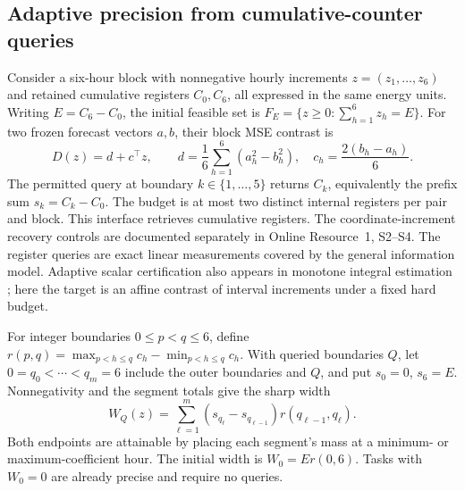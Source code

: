 \subsection{Adaptive precision from cumulative-counter queries}
\label{sec:counter-precision-method}
Consider a six-hour block with nonnegative hourly increments
$z=(z_1,\ldots,z_6)$ and retained cumulative registers $C_0,C_6$,
all expressed in the same energy units.
Writing $E=C_6-C_0$, the initial feasible set is
$F_E=\{z\geq0:\sum_{h=1}^6z_h=E\}$.
For two frozen forecast vectors $a,b$, their block MSE contrast is
\[
 D(z)=d+c^\top z,\qquad
 d=\frac16\sum_{h=1}^6(a_h^2-b_h^2),\quad
 c_h=\frac{2(b_h-a_h)}6.
\]
The permitted query at boundary $k\in\{1,\ldots,5\}$ returns
$C_k$, equivalently the prefix sum $s_k=C_k-C_0$.
The budget is at most two distinct internal registers per pair and block.
This interface retrieves cumulative registers. The coordinate-increment
recovery controls are documented separately in Online Resource~1, S2--S4.
The register queries are exact linear measurements covered by the general
information model. Adaptive scalar certification also appears in monotone
integral estimation \citep[Section~4.1]{gaillard2023}; here the target is an
affine contrast of interval increments under a fixed hard budget.

For integer boundaries $0\leq p<q\leq6$, define
$r(p,q)=\max_{p<h\leq q}c_h-\min_{p<h\leq q}c_h$.
With queried boundaries $Q$, let $0=q_0<\cdots<q_m=6$ include
the outer boundaries and $Q$, and put $s_0=0$, $s_6=E$.
Nonnegativity and the segment totals give the sharp width
\begin{equation}
 W_Q(z)=\sum_{\ell=1}^{m}
 (s_{q_\ell}-s_{q_{\ell-1}})r(q_{\ell-1},q_\ell).
 \label{eq:counter-width}
\end{equation}
Both endpoints are attainable by placing each segment's mass at a
minimum- or maximum-coefficient hour. The initial width is $W_0=Er(0,6)$.
Tasks with $W_0=0$ are already precise and require no queries.

